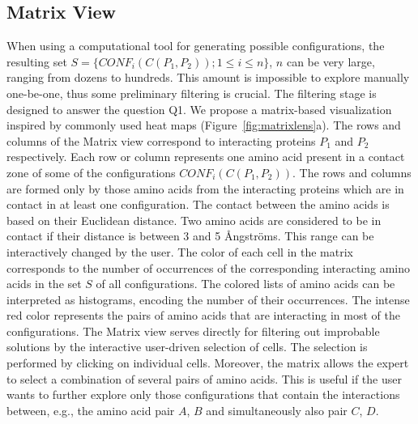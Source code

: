 \documentclass{bmcart}
\def\MatView {Matrix view\xspace}
\begin{document}

\subsection*{Matrix View}
\label{sec:matview}
When using a computational tool for generating possible configurations, the resulting set $S = \{CONF_i(C(P_1,P_2)); 1 \leq i \leq n\}$, $n$ can be very large, ranging from dozens to hundreds. 
This amount is impossible to explore manually one-be-one, thus some preliminary filtering is crucial.
The filtering stage is designed to answer the question Q1.
We propose a matrix-based visualization inspired by commonly used heat maps (Figure~\ref{fig:matrixlens}a).
The rows and columns of the \MatView correspond to interacting proteins $P_1$ and $P_2$ respectively.
Each row or column represents one amino acid present in a contact zone of some of the configurations $CONF_i(C(P_1,P_2))$. 
The rows and columns are formed only by those amino acids from the interacting proteins which are in contact in at least one configuration.
The contact between the amino acids is based on their Euclidean distance. 
Two amino acids are considered to be in contact if their distance is between 3 and 5 \AA ngstr\"{o}ms.
This range can be interactively changed by the user.
The color of each cell in the matrix corresponds to the number of occurrences of the corresponding interacting amino acids in the set $S$ of all configurations. 
The colored lists of amino acids can be interpreted as histograms, encoding the number of their occurrences.
The intense red color represents the pairs of amino acids that are interacting in most of the configurations.
The \MatView serves directly for filtering out improbable solutions by the interactive user-driven selection of cells.
The selection is performed by clicking on individual cells. 
Moreover, the matrix allows the expert to select a combination of several pairs of amino acids.
This is useful if the user wants to further explore only those configurations that contain the interactions between, e.g., the amino acid pair $A$, $B$ and simultaneously also pair $C$, $D$. 

\end{document}
